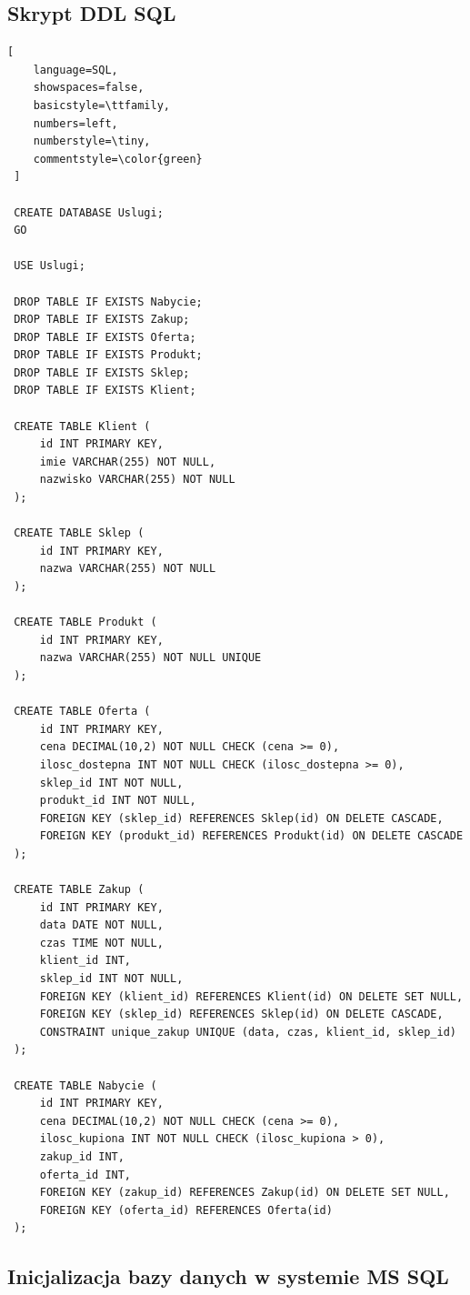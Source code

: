 \documentclass[a4paper,12pt]{article}
\begin{document}
\subsection{Skrypt DDL SQL}

\begin{lstlisting}[
    language=SQL,
    showspaces=false,
    basicstyle=\ttfamily,
    numbers=left,
    numberstyle=\tiny,
    commentstyle=\color{green}
 ]

 CREATE DATABASE Uslugi;
 GO
 
 USE Uslugi;
 
 DROP TABLE IF EXISTS Nabycie;
 DROP TABLE IF EXISTS Zakup;
 DROP TABLE IF EXISTS Oferta;
 DROP TABLE IF EXISTS Produkt;
 DROP TABLE IF EXISTS Sklep;
 DROP TABLE IF EXISTS Klient;
 
 CREATE TABLE Klient (
     id INT PRIMARY KEY,
     imie VARCHAR(255) NOT NULL,
     nazwisko VARCHAR(255) NOT NULL
 );
 
 CREATE TABLE Sklep (
     id INT PRIMARY KEY,
     nazwa VARCHAR(255) NOT NULL
 );
 
 CREATE TABLE Produkt (
     id INT PRIMARY KEY,
     nazwa VARCHAR(255) NOT NULL UNIQUE
 );
 
 CREATE TABLE Oferta (
     id INT PRIMARY KEY,
     cena DECIMAL(10,2) NOT NULL CHECK (cena >= 0),
     ilosc_dostepna INT NOT NULL CHECK (ilosc_dostepna >= 0),
     sklep_id INT NOT NULL,
     produkt_id INT NOT NULL,
     FOREIGN KEY (sklep_id) REFERENCES Sklep(id) ON DELETE CASCADE,
     FOREIGN KEY (produkt_id) REFERENCES Produkt(id) ON DELETE CASCADE
 );
 
 CREATE TABLE Zakup (
     id INT PRIMARY KEY,
     data DATE NOT NULL,
     czas TIME NOT NULL,
     klient_id INT,
     sklep_id INT NOT NULL,
     FOREIGN KEY (klient_id) REFERENCES Klient(id) ON DELETE SET NULL,
     FOREIGN KEY (sklep_id) REFERENCES Sklep(id) ON DELETE CASCADE,
     CONSTRAINT unique_zakup UNIQUE (data, czas, klient_id, sklep_id)
 );
 
 CREATE TABLE Nabycie (
     id INT PRIMARY KEY,
     cena DECIMAL(10,2) NOT NULL CHECK (cena >= 0),
     ilosc_kupiona INT NOT NULL CHECK (ilosc_kupiona > 0),
     zakup_id INT,
     oferta_id INT,
     FOREIGN KEY (zakup_id) REFERENCES Zakup(id) ON DELETE SET NULL,
     FOREIGN KEY (oferta_id) REFERENCES Oferta(id)
 ); 

\end{lstlisting}

\subsection{Inicjalizacja bazy danych w systemie MS SQL}
\end{document}
